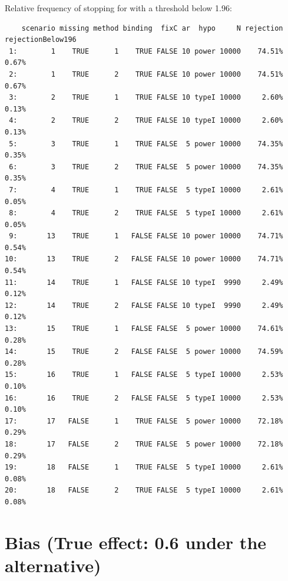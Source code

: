 \documentclass[12pt]{article}
\begin{document}
Relative frequency of stopping for with a threshold below 1.96:
\begin{verbatim}
    scenario missing method binding  fixC ar  hypo     N rejection rejectionBelow196
 1:        1    TRUE      1    TRUE FALSE 10 power 10000    74.51%             0.67%
 2:        1    TRUE      2    TRUE FALSE 10 power 10000    74.51%             0.67%
 3:        2    TRUE      1    TRUE FALSE 10 typeI 10000     2.60%             0.13%
 4:        2    TRUE      2    TRUE FALSE 10 typeI 10000     2.60%             0.13%
 5:        3    TRUE      1    TRUE FALSE  5 power 10000    74.35%             0.35%
 6:        3    TRUE      2    TRUE FALSE  5 power 10000    74.35%             0.35%
 7:        4    TRUE      1    TRUE FALSE  5 typeI 10000     2.61%             0.05%
 8:        4    TRUE      2    TRUE FALSE  5 typeI 10000     2.61%             0.05%
 9:       13    TRUE      1   FALSE FALSE 10 power 10000    74.71%             0.54%
10:       13    TRUE      2   FALSE FALSE 10 power 10000    74.71%             0.54%
11:       14    TRUE      1   FALSE FALSE 10 typeI  9990     2.49%             0.12%
12:       14    TRUE      2   FALSE FALSE 10 typeI  9990     2.49%             0.12%
13:       15    TRUE      1   FALSE FALSE  5 power 10000    74.61%             0.28%
14:       15    TRUE      2   FALSE FALSE  5 power 10000    74.59%             0.28%
15:       16    TRUE      1   FALSE FALSE  5 typeI 10000     2.53%             0.10%
16:       16    TRUE      2   FALSE FALSE  5 typeI 10000     2.53%             0.10%
17:       17   FALSE      1    TRUE FALSE  5 power 10000    72.18%             0.29%
18:       17   FALSE      2    TRUE FALSE  5 power 10000    72.18%             0.29%
19:       18   FALSE      1    TRUE FALSE  5 typeI 10000     2.61%             0.08%
20:       18   FALSE      2    TRUE FALSE  5 typeI 10000     2.61%             0.08%
\end{verbatim}


\clearpage

\section{Bias (True effect: 0.6 under the alternative)}
\label{sec:org76bd5f1}
\end{document}
